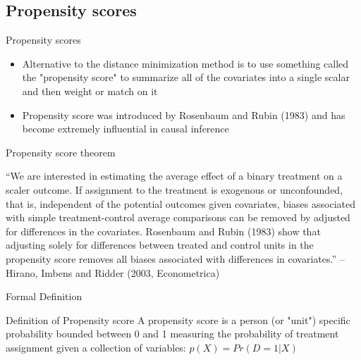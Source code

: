 \documentclass{beamer}
\begin{document}
\subsection{Propensity scores}


\begin{frame}{Propensity scores}

\begin{itemize}
\item Alternative to the distance minimization method is to use something called the "propensity score" to summarize all of the covariates into a single scalar and then weight or match on it 
\item Propensity score was introduced by Rosenbaum and Rubin (1983) and has become extremely influential in causal inference
\end{itemize}



\end{frame}

\begin{frame}{Propensity score theorem}

\footnotesize
``We are interested in estimating the average effect of a binary treatment on a scaler outcome.  If assignment to the treatment is exogenous or unconfounded, that is, independent of the potential outcomes given covariates, biases associated with simple treatment-control average comparisons can be removed by adjusted for differences in the covariates.  Rosenbaum and Rubin (1983) show that adjusting solely for differences between treated and control units in the propensity score removes all biases associated with differences in covariates.'' -- Hirano, Imbens and Ridder (2003, Econometrica)

\end{frame}





\begin{frame}{Formal Definition}
	
	\begin{block}{Definition of Propensity score}
	A propensity score is a person (or "unit") specific probability bounded between 0 and 1 measuring the probability of treatment assignment given a collection of variables: $p(X)=Pr(D=1 | X)$
	\end{block}
	

\end{frame}
\end{document}
